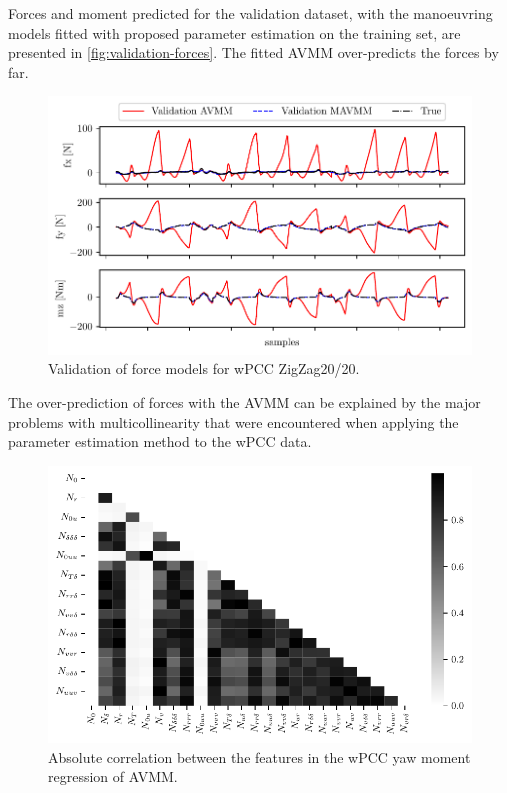 Forces and moment predicted for the validation dataset, with the manoeuvring models fitted with proposed parameter estimation on the training set, are presented in \autoref{fig:validation-forces}. The fitted AVMM over-predicts the forces by far. 
\begin{figure}[h!]
\centering
\includegraphics[width=1.0\textwidth]{kappa/images/7.pdf}
\caption{Validation of force models for wPCC ZigZag20/20.}\label{fig:validation-forces}
\end{figure}
\noindent The over-prediction of forces with the AVMM can be explained by the major problems with multicollinearity that were encountered when applying the parameter estimation method to the wPCC data.
\begin{figure}[ht!]
\centering
\includegraphics[width=1.0\textwidth]{kappa/images/10.pdf}
\caption{Absolute correlation between the features in the wPCC yaw moment regression of AVMM.}\label{\detokenize{06.10_results_wpcc:fig-ncorr}}
\end{figure}
